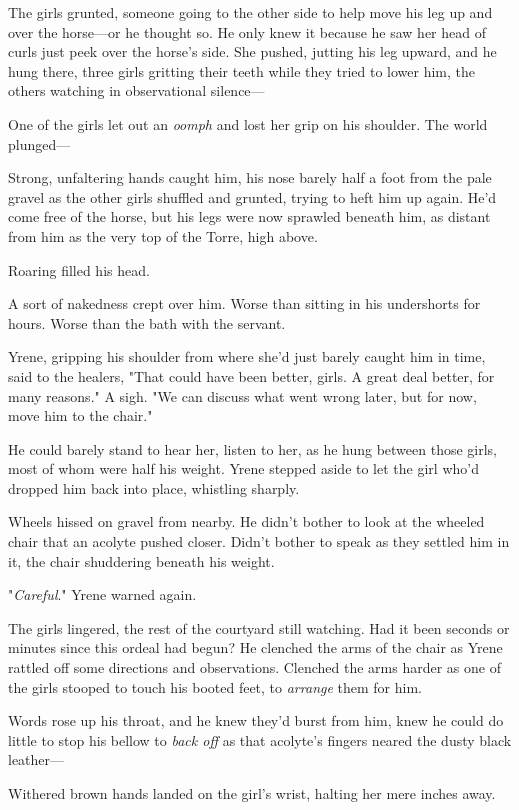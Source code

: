 The girls grunted, someone going to the other side to help move his leg up and over the horse---or he thought so.
He only knew it because he saw her head of curls just peek over the horse's side.
She pushed, jutting his leg upward, and he hung there, three girls gritting their teeth while they tried to lower him, the others watching in observational silence---

One of the girls let out an \emph{oomph} and lost her grip on his shoulder.
The world plunged---

Strong, unfaltering hands caught him, his nose barely half a foot from the pale gravel as the other girls shuffled and grunted, trying to heft him up again.
He'd come free of the horse, but his legs were now sprawled beneath him, as distant from him as the very top of the Torre, high above.

Roaring filled his head.

A sort of nakedness crept over him.
Worse than sitting in his undershorts for hours.
Worse than the bath with the servant.

Yrene, gripping his shoulder from where she'd just barely caught him in time, said to the healers, "That could have been better, girls.
A great deal better, for many reasons."
A sigh.
"We can discuss what went wrong later, but for now, move him to the chair."

He could barely stand to hear her, listen to her, as he hung between those girls, most of whom were half his weight.
Yrene stepped aside to let the girl who'd dropped him back into place, whistling sharply.

Wheels hissed on gravel from nearby.
He didn't bother to look at the wheeled chair that an acolyte pushed closer.
Didn't bother to speak as they settled him in it, the chair shuddering beneath his weight.

"\emph{Careful}."
Yrene warned again.

The girls lingered, the rest of the courtyard still watching.
Had it been seconds or minutes since this ordeal had begun?
He clenched the arms of the chair as Yrene rattled off some directions and observations.
Clenched the arms harder as one of the girls stooped to touch his booted feet, to \emph{arrange} them for him.

Words rose up his throat, and he knew they'd burst from him, knew he could do little to stop his bellow to \emph{back off} as that acolyte's fingers neared the dusty black leather---

Withered brown hands landed on the girl's wrist, halting her mere inches away.

